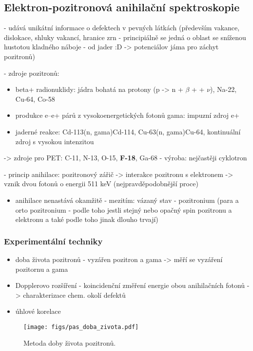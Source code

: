 \subsection{Elektron-pozitronová anihilační spektroskopie}
- udává unikátní informace o defektech v pevných látkách (především vakance, dislokace, shluky vakancí, hranice zrn - principiálně se jedná o oblast se sníženou hustotou kladného náboje - od jader :D -> potenciálov jáma pro záchyt pozitronů)

- zdroje pozitronů:
\begin{itemize}
	\item beta+ radionuklidy: jádra bohatá na protony (p -> n + $\beta$ + + $\nu$), Na-22, Cu-64, Co-58
	\item produkce e--e+ párů z vysokoenergetických fotonů gama: impuzní zdroj e+
	\item jaderné reakce: Cd-113(n, gama)Cd-114, Cu-63(n, gama)Cu-64, kontinuální zdroj s vysokou intenzitou
\end{itemize}

-> zdroje pro PET: C-11, N-13, O-15, \textbf{F-18}, Ga-68 - výroba: nejčastěji cyklotron

\noindent- princip anihilace: pozitronový zářič -> interakce pozitronu s elektronem -> vznik dvou fotonů o energii 511 keV (nejpravděpodobnější proce)

\begin{itemize}
    \item anihilace nenastává okamžitě - mezitím: vázaný stav - pozitronium (para a orto pozitronium - podle toho jestli stejný nebo opačný spin pozitronu a elektronu a také podle toho jinak dlouho trvají)
\end{itemize}



\subsubsection{Experimentální techniky}
\begin{itemize}
    \item doba života pozitronů - vyzářen pozitron a gama -> měří se vyzáření pozitornu a gama
    \item Dopplerovo rozšíření  - koincidenční změření energie obou anihilačních fotonů -> charakterizace chem. okolí defektů

    \item úhlové korelace
\end{itemize}

\begin{figure}[ht!]
    \centering
    \texttt{[image: figs/pas\_doba\_zivota.pdf]}
    \caption{Metoda doby života pozitronů.}
    \label{fig:6_2_pas_doba_zivota}
\end{figure}

